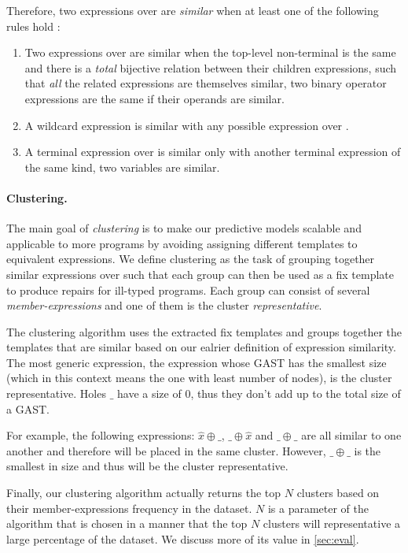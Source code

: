 Therefore, two expressions over \repairLang are \emph{similar} when at least one
of the following rules hold :
\begin{enumerate}
    \item Two expressions over \repairLang are similar when the top-level
    non-terminal is the same and there is a \emph{total} bijective relation
    between their children expressions, such that \emph{all} the related
    expressions are themselves similar, \eg two binary operator expressions are
    the same if their operands are similar.
    \item A wildcard expression is similar with any possible expression over
    \repairLang.
    \item A terminal expression over \repairLang is similar only with another
    terminal expression of the same kind, \eg two variables are similar.
\end{enumerate}

\paragraph{Clustering.}
The main goal of \emph{clustering} is to make our predictive models scalable and
applicable to more programs by avoiding assigning different templates to
equivalent expressions. We define clustering as the task of grouping together
similar expressions over \repairLang such that each group can then be used as a
fix template to produce repairs for ill-typed programs. Each group can consist
of several \emph{member-expressions} and one of them is the cluster
\emph{representative}.

The clustering algorithm uses the extracted fix templates and groups together
the templates that are similar based on our ealrier definition of expression
similarity. The most generic expression, \ie the expression whose GAST has the
smallest size (which in this context means the one with least number of nodes),
is the cluster representative. Holes $\_$ have a size of $0$, thus they don't
add up to the total size of a GAST.

For example, the following expressions: $\hat{x} \oplus \_$, $\_ \oplus \hat{x}$
and $\_ \oplus \_$ are all similar to one another and therefore will be placed
in the same cluster. However, $\_ \oplus \_$ is the smallest in size and thus
will be the cluster representative.

Finally, our clustering algorithm actually returns the top $N$ clusters based on
their member-expressions frequency in the dataset. $N$ is a parameter of the
algorithm that is chosen in a manner that the top $N$ clusters will
representative a large percentage of the dataset. We discuss more of its value
in \autoref{sec:eval}.
